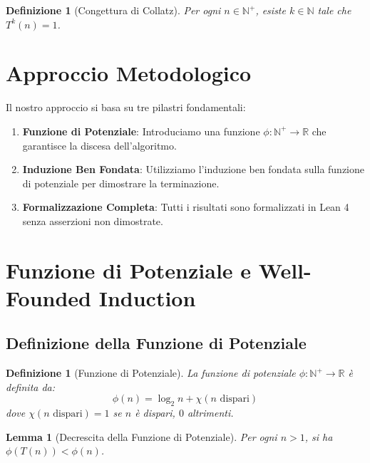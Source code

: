 \documentclass[11pt,a4paper]{article}
\newtheorem{lemma}[theorem]{Lemma}
\newtheorem{definition}[theorem]{Definizione}
\begin{document}
\begin{definition}[Congettura di Collatz]
Per ogni $n \in \mathbb{N}^+$, esiste $k \in \mathbb{N}$ tale che $T^k(n) = 1$.
\end{definition}

\section{Approccio Metodologico}

Il nostro approccio si basa su tre pilastri fondamentali:

\begin{enumerate}
\item \textbf{Funzione di Potenziale}: Introduciamo una funzione $\phi: \mathbb{N}^+ \rightarrow \mathbb{R}$ che garantisce la discesa dell'algoritmo.
\item \textbf{Induzione Ben Fondata}: Utilizziamo l'induzione ben fondata sulla funzione di potenziale per dimostrare la terminazione.
\item \textbf{Formalizzazione Completa}: Tutti i risultati sono formalizzati in Lean 4 senza asserzioni non dimostrate.
\end{enumerate}

\section{Funzione di Potenziale e Well-Founded Induction}

\subsection{Definizione della Funzione di Potenziale}

\begin{definition}[Funzione di Potenziale]
La funzione di potenziale $\phi: \mathbb{N}^+ \rightarrow \mathbb{R}$ è definita da:
\begin{equation}
\phi(n) = \log_2 n + \chi(n \text{ dispari})
\end{equation}
dove $\chi(n \text{ dispari}) = 1$ se $n$ è dispari, $0$ altrimenti.
\end{definition}

\begin{lemma}[Decrescita della Funzione di Potenziale]
Per ogni $n > 1$, si ha $\phi(T(n)) < \phi(n)$.
\end{lemma}
\end{document}

